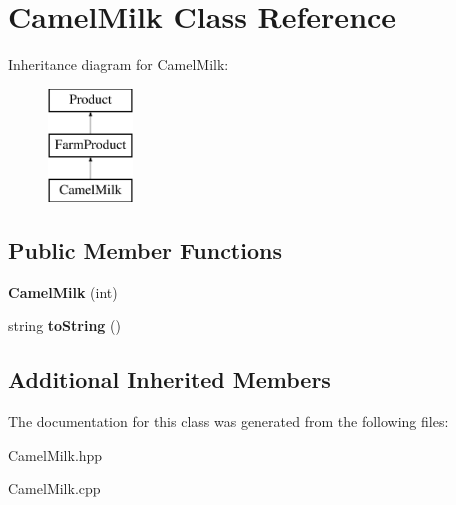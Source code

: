 \hypertarget{class_camel_milk}{}\section{Camel\+Milk Class Reference}
\label{class_camel_milk}
Inheritance diagram for Camel\+Milk\+:\begin{figure}[H]
\begin{center}
\leavevmode
\includegraphics[height=3.000000cm]{class_camel_milk}
\end{center}
\end{figure}
\subsection*{Public Member Functions}
\begin{DoxyCompactItemize}
\item 
\mbox{\label{class_camel_milk_a8232e83022cc25b47c4ac3c02642d922}} 
{\bfseries Camel\+Milk} (int)
\item 
\mbox{\label{class_camel_milk_addc1b5665f9805c77fd93eb1c42dfc11}} 
string {\bfseries to\+String} ()
\end{DoxyCompactItemize}
\subsection*{Additional Inherited Members}


The documentation for this class was generated from the following files\+:\begin{DoxyCompactItemize}
\item 
Camel\+Milk.\+hpp\item 
Camel\+Milk.\+cpp\end{DoxyCompactItemize}
